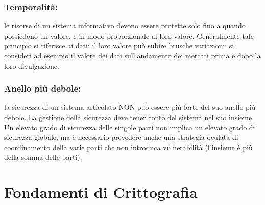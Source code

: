 \subsubsection{Temporalità:}  le risorse di un sistema informativo devono essere protette solo fino a quando possiedono un valore, e in modo proporzionale al loro valore. Generalmente tale principio si riferisce ai dati: il loro valore può subire brusche variazioni; si consideri ad esempio il valore dei dati sull’andamento dei mercati prima e dopo la loro divulgazione.

\subsubsection{Anello più debole:}  la sicurezza di un sistema articolato NON può essere più forte del suo anello più debole. La gestione della sicurezza deve tener conto del sistema nel suo insieme. Un elevato grado di sicurezza delle singole parti non implica un elevato grado di sicurezza globale, ma è necessario prevedere anche una strategia oculata di coordinamento della varie parti che non introduca vulnerabilità  (l'insieme è più della somma delle parti).

\section{Fondamenti di Crittografia}